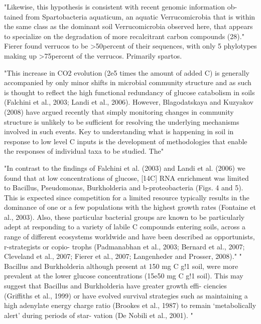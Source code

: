"Likewise, this hypothesis is consistent with recent genomic information ob- tained from Spartobacteria aquaticum, an aquatic Verrucomicrobia that is within the same class as the dominant soil Verrucomicrobia observed here, that appears to specialize on the degradation of more recalcitrant carbon compounds (28)."  Fierer found verrucos to be >50percent of their sequences, with only 5 phylotypes making up >75percent of the verrucos.  Primarily spartos.  \cite{Fierer_2013} 

"This increase in CO2 evolution (2e5 times the amount of added C) is generally accompanied by only minor shifts in microbial community structure and as such is thought to reflect the high functional redundancy of glucose catabolism in soils (Falchini et al., 2003; Landi et al., 2006). However, Blagodatskaya and Kuzyakov (2008) have argued recently that simply monitoring changes in community structure is unlikely to be sufficient for resolving the underlying mechanisms involved in such events. Key to understanding what is happening in soil in response to low level C inputs is the development of methodologies that enable the responses of individual taxa to be studied. The" \cite{Jenkins_2010}

"In contrast to the findings of Falchini et al. (2003) and Landi et al. (2006) we found that at low concentrations of glucose, [14C] RNA enrichment was limited to Bacillus, Pseudomonas, Burkholderia and b-proteobacteria (Figs. 4 and 5). This is expected since competition for a limited resource typically results in the dominance of one or a few populations with the highest growth rates (Fontaine et al., 2003). Also, these particular bacterial groups are known to be particularly adept at responding to a variety of labile C compounds entering soils, across a range of different ecosystems worldwide and have been described as opportunists, r-strategists or copio- trophs (Padmanabhan et al., 2003; Bernard et al., 2007; Cleveland et al., 2007; Fierer et al., 2007; Langenheder and Prosser, 2008)." " Bacillus and Burkholderia although present at 150 mg C g!1 soil, were more prevalent at the lower glucose concentrations (15e50 mg C g!1 soil). This may suggest that Bacillus and Burkholderia have greater growth effi- ciencies (Griffiths et al., 1999) or have evolved survival strategies such as maintaining a high adenylate energy charge ratio (Brookes et al., 1987) to remain ‘metabolically alert’ during periods of star- vation (De Nobili et al., 2001). "\cite{Jenkins_2010}


